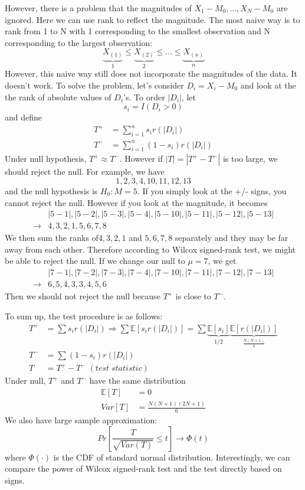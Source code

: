 \documentclass[twoside]{article}
\begin{document}
However, there is a problem that the magnitudes of $X_1 - M_0, ..., X_N - M_0$ are ignored. Here we can use rank to reflect the magnitude. The most naive way is to rank from 1 to N with 1 corresponding to the smallest observation and N corresponding to the largest observation: 
$$
\underbrace{X_{(1)}}_{1} \leqslant \underbrace{X_{(2)}}_{2} \leqslant ... \leqslant \underbrace{X_{(n)}}_n
$$
However, this naive way still does not incorporate the magnitudes of the data. It doesn't work. To solve the problem, let's consider $D_i = X_i - M_0$ and look at the the rank of absolute values of $D_i$'s. To order $|D_i|$, let
$$
s_i = I \left( D_i > 0 \right)
$$
and define
\begin{align*}
	T^+ &= \sum_{i=1}^n s_i r \left( |D_i| \right) \\
	T^- &= \sum_{i=1}^n (1 - s_i) r \left( |D_i| \right)
\end{align*}
Under null hypothesis, $T^+ \approx T^-$. However if $|T| = |T^+ - T^-|$ is too large, we should reject the null. For example, we have 
$$
1, 2, 3, 4, 10, 11, 12, 13
$$
and the null hypothesis is $H_0: M = 5$. If you simply look at the +/- signs, you cannot reject the null. However if you look at the magnitude, it becomes
\begin{align*}
	&|5-1|, |5-2|, |5-3|, |5-4|, |5-10|, |5-11|, |5-12|, |5-13| \\
	\rightarrow &4, 3, 2, 1, 5, 6, 7, 8
\end{align*}
We then sum the ranks of$4, 3, 2, 1$ and $5, 6, 7, 8$ separately and they may be far away from each other. Therefore according to Wilcox signed-rank test, we might be able to reject the null. If we change our null to $\mu = 7$, we get
\begin{align*}
	&|7-1|, |7-2|, |7-3|, |7-4|, |7-10|, |7-11|, |7-12|, |7-13| \\
	\rightarrow &6, 5, 4, 3, 3, 4, 5, 6
\end{align*}
Then we should not reject the null because $T^+$ is close to $T^-$. 

To sum up, the test procedure is as follows: 
\begin{align*}
	T^+ &= \sum s_i r\left( |D_i| \right) \Rightarrow \sum \mathbb{E}[s_i r(|D_i|)] = \sum \underbrace{\mathbb{E}[s_i]}_{1/2} \underbrace{\mathbb{E}[r(|D_i|)]}_{\frac{N(N+1)}{4}} \\
	T^- &= \sum (1 - s_i) r\left( |D_i| \right) \\
	T &= T^+ - T^- \; (test \; statistic)
\end{align*}
Under null, $T^+$ and $T^-$ have the same distribution
\begin{align*}
	\mathbb{E} \left[ T \right] &= 0 \\
	Var \left[ T \right] &= \frac{N (N+1) (2N+1)}{6}
\end{align*}
We also have large sample approximation:
$$
Pr \left[ \frac{T}{\sqrt{Var \left( T \right)}} \leqslant t \right] \rightarrow \Phi(t)
$$
where $\Phi (\cdot)$ is the CDF of standard normal distribution. Interestingly, we can compare the power of Wilcox signed-rank test and the test directly based on signs. 
\end{document}
